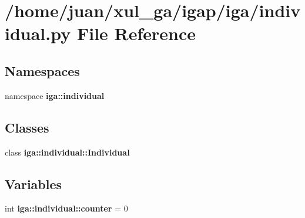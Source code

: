 \section{/home/juan/xul\_\-ga/igap/iga/individual.py File Reference}
\label{individual_8py}
\subsection*{Namespaces}
\begin{CompactItemize}
\item 
namespace {\bf iga::individual}
\end{CompactItemize}
\subsection*{Classes}
\begin{CompactItemize}
\item 
class {\bf iga::individual::Individual}
\end{CompactItemize}
\subsection*{Variables}
\begin{CompactItemize}
\item 
int {\bf iga::individual::counter} = 0
\end{CompactItemize}
